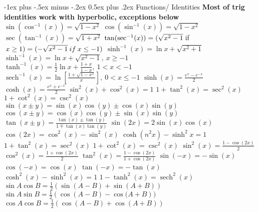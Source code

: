 \documentclass[10pt,a4paper,landscape]{article}
\makeatletter
\DeclareMathOperator{\sech}{sech}
\renewcommand{\section}{\@startsection{section}{1}{0mm}%
{-1ex plus -.5ex minus -.2ex}%
{0.5ex plus .2ex}%
{\normalfont\large\bfseries}}
\makeatother
\begin{document}
\begin{multicols*}{5}
	\section{Functions/ Identities}
	\textbf{Most of trig identities work with hyperbolic, exceptions below}\newline  
	$\sin(\cos^{-1}(x)) = \sqrt{1-x^2}$\newline
	$\cos(\sin^{-1}(x)) = \sqrt{1-x^2} $\newline
	$\sec(\tan^{-1}(x)) = \sqrt{1+x^2} $\newline
	$\tan(\sec^{-1}(x)) \newline = (\sqrt{x^2-1} \: $if$ \: x \ge 1)\newline =(-\sqrt{x^2-1} \: if \: x \le -1)$
	$\sinh^{-1}(x) = \ln{x+\sqrt{x^2+1}} $\newline
	$\sinh^{-1}(x) = \ln{x+\sqrt{x^2-1}}, \: x \ge -1 $\newline
	$\tanh^{-1}(x) = \frac{1}{2}\ln{x+\frac{1+x}{1-x}}, \: 1 < x < -1 $\newline
	$\sech^{-1}(x) = \ln[{\frac{1+\sqrt{1-x^2}}{x}}], \: 0 < x \le -1 $\newline
	$\sinh(x) = \frac{e^{x}-e^{-x}}{2} $\newline
	$\cosh(x) = \frac{e^{x}+e^{-x}}{2} $\newline
	$ \sin^2(x)+\cos^2(x) = 1 $\newline
	$ 1+\tan^2(x) = \sec^2(x) $\newline
	$ 1+\cot^2(x) = \csc^2(x) $\newline
	$ \sin(x\pm y) = \sin(x)\cos(y)\pm\cos(x)\sin(y) $\newline
	$ \cos(x\pm y) = \cos(x)\cos(y)\pm\sin(x)\sin(y) $\newline
	$ \tan(x\pm y) = \frac{\tan(x)\pm\tan(y)}{1 \mp \tan(x)\tan(y)} $\newline
	$ \sin(2x) = 2\sin(x)\cos(x) $\newline
	$ \cos(2x) = \cos^{2}(x) - \sin^{2}(x) $\newline
	$ \cosh(n^{2}x)-\sinh^{2}x = 1 $\newline
	$ 1+\tan^2(x) = \sec^2(x) $\newline
	$ 1+\cot^2(x) = \csc^2(x) $\newline
	$ \sin^2(x) = \frac{1-\cos(2x)}{2} $\newline
	$ \cos^2(x) = \frac{1+\cos(2x)}{2} $\newline
	$ \tan^2(x) = \frac{1-\cos(2x)}{1+\cos(2x)} $\newline
	$ \sin(-x) = -\sin(x) $\newline
	$ \cos(-x) = \cos(x) $\newline
	$ \tan(-x) = -\tan(x) $\newline
	$ \cosh^2(x) - \sinh^2(x) = 1 $\newline
	$ 1-\tanh^2(x) = \sech^2(x) $
	$ \sin{ A } \cos{ B } = \frac{1}{2} ( \sin{( A-B )} + \sin{( A+B )}   ) $
	$ \sin{ A } \sin{ B } = \frac{1}{2} ( \cos{( A-B )} - \cos{( A+B }   )) $
	$ \cos{ A } \cos{ B } = \frac{1}{2} ( \cos{ (A-B) } + \cos{ (A+B) }   ) $

\end{multicols*}
\end{document}
